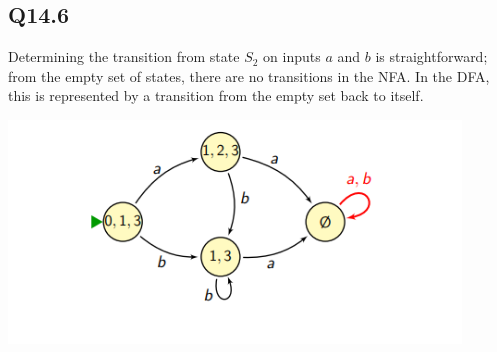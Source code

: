 \documentclass{article}
\begin{document}
\subsection*{Q14.6}
Determining the transition from state \( S_2 \) on inputs \( a \) and \( b \) is straightforward; from the empty set of states, there are no transitions in the NFA. In the DFA, this is represented by a transition from the empty set back to itself.
\begin{center}
    \includegraphics[width=12cm]{6.png}
\end{center}
\newpage
\end{document}
